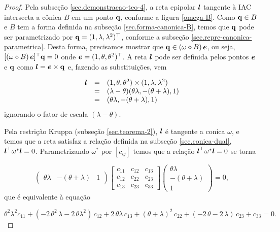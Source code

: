 \begin{proof}

Pela subseção \ref{sec.demonstracao-teo-4}, a reta epipolar $\boldsymbol{l}$ tangente à IAC intersecta a cônica $B$ em um ponto ${\bf q}$, conforme a figura \ref{omega-B}. Como ${\bf q}\in B$ e $B$ tem a forma definida na subseção \ref{sec.forma-canonica-B}, temos que ${\bf q}$ pode ser parametrizado por ${\bf q}=(1,\lambda,\lambda^2)^\top$, conforme a subseção \ref{sec.repre-canonica-parametrica}. Desta forma, precisamos mostrar que ${\bf q}\in (\omega\diamond B)\,\boldsymbol{e}$, ou seja, $[(\omega\diamond B)\,\boldsymbol{e}]^\top {\bf q}=0$ onde $\boldsymbol{e}=(1,\theta,\theta^2)^\top$. A reta $\boldsymbol{l}$ pode ser definida pelos pontos $\boldsymbol{e}$ e ${\bf q}$ como $\boldsymbol{l}=\boldsymbol{e}\times {\bf q}$ e, fazendo as substituições, vem

\begin{equation*}
\begin{array}{rcl}
\boldsymbol{l}&=&(1,\theta ,\theta^2)\times (1,\lambda,\lambda^2)\\
&=&(\lambda -\theta)(\theta\lambda,-(\theta+\lambda),1)\\
&=&(\theta\lambda,-(\theta+\lambda),1)
\end{array}
\end{equation*}
ignorando o fator de escala $(\lambda-\theta)$.

Pela restrição Kruppa (subseção \ref{sec.teorema-2}), $\boldsymbol{l}$ é tangente a conica $\omega$, e temos que a reta satisfaz a relação definida na subseção \ref{sec.conica-dual}, $\boldsymbol{l}^\top\omega^*\boldsymbol{l}=0$. Parametrizando $\omega^*$ por $[c_{ij}]$ temos que a relação $\boldsymbol{l}^\top\omega^*\boldsymbol{l}=0$ se torna

\begin{equation*}
\begin{pmatrix}
\theta\lambda&-(\theta+\lambda)&1
\end{pmatrix}
\begin{bmatrix}
c_{11}&c_{12}&c_{13}\\
c_{12}&c_{22}&c_{23}\\
c_{13}&c_{23}&c_{33}
\end{bmatrix}
\begin{pmatrix}
\theta\lambda\\
-(\theta+\lambda)\\
1
\end{pmatrix}
=0,
\end{equation*}  
que é equivalente à equação

\begin{equation}\label{eq.expandida-omega-dual}
\theta^2\lambda^2 c_{11}+(-2\,\theta^2\,\lambda-2\,\theta\lambda^2)\,c_{12}+2\,\theta\lambda\,c_{13}+(\theta+\lambda)^2\,c_{22}+(-2\,\theta-2\,\lambda)\,c_{23}+c_{33}=0.
\end{equation} 


\end{proof}
